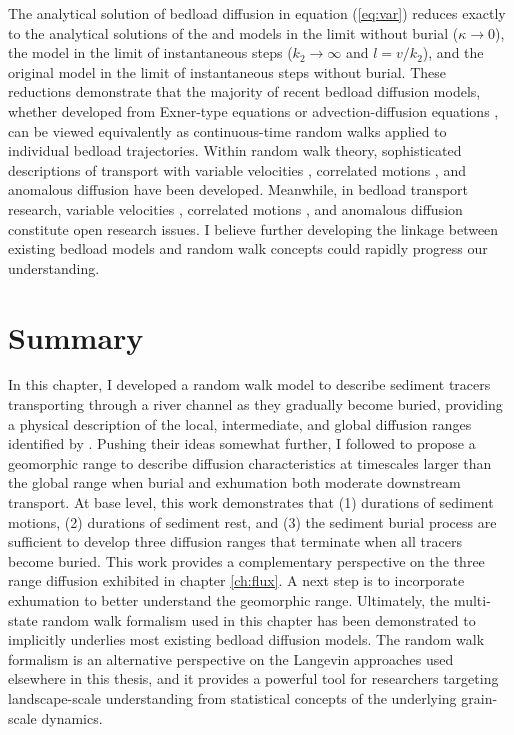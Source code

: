 The analytical solution of bedload diffusion in equation (\ref{eq:var}) reduces exactly to the analytical solutions of the \citet{Lisle1998} and \citet{Lajeunesse2017} models in the limit without burial ($\kappa \rightarrow 0$), the \citet{Wu2019} model in the limit of instantaneous steps ($k_2 \rightarrow \infty$ and $l = v/k_2$), and the original \citet{Einstein1937} model in the limit of instantaneous steps without burial.
These reductions demonstrate that the majority of recent bedload diffusion models, whether developed from Exner-type equations \citep{Wu2019,Pelosi2014,Pelosi2016} or advection-diffusion equations \citep{Lisle1998,Lajeunesse2017}, can be viewed equivalently as continuous-time random walks applied to individual bedload trajectories.
Within random walk theory, sophisticated descriptions of transport with variable velocities \citep{Zaburdaev2008,Masoliver1994}, correlated motions \citep{Escaff2018,Vicsek2012a}, and anomalous diffusion \citep{Masoliver2016,Fa2014,Metzler2014} have been developed.
Meanwhile, in bedload transport research, variable velocities \citep{Lajeunesse2010,Furbish2012,Heyman2016}, correlated motions \citep{Heyman2014,Lee2018,Saletti2020}, and anomalous diffusion \citep{Fathel2016,Bradley2017,Schumer2009} constitute open research issues.
I believe further developing the linkage between existing bedload models and random walk concepts could rapidly progress our understanding.

\section{Summary}
\label{sec:conclusion}
In this chapter, I developed a random walk model to describe sediment tracers transporting through a river channel as they gradually become buried, providing a physical description of the local, intermediate, and global diffusion ranges identified by \citet{Nikora2002}.
Pushing their ideas somewhat further, I followed \citet{Hassan2017} to propose a geomorphic range to describe diffusion characteristics at timescales larger than the global range when burial and exhumation both moderate downstream transport.
At base level, this work demonstrates that (1) durations of sediment motions, (2) durations of sediment rest, and (3) the sediment burial process are sufficient to develop three diffusion ranges that terminate when all tracers become buried.
This work provides a complementary perspective on the three range diffusion exhibited in chapter \ref{ch:flux}.
A next step is to incorporate exhumation to better understand the geomorphic range.
Ultimately, the multi-state random walk formalism used in this chapter has been demonstrated to implicitly underlies most existing bedload diffusion models.
The random walk formalism is an alternative perspective on the Langevin approaches used elsewhere in this thesis, and it provides a powerful tool for researchers targeting landscape-scale understanding from statistical concepts of the underlying grain-scale dynamics.
